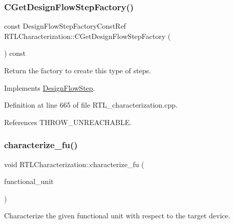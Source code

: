 \subsubsection{\texorpdfstring{C\+Get\+Design\+Flow\+Step\+Factory()}{CGetDesignFlowStepFactory()}}
{\footnotesize\ttfamily const Design\+Flow\+Step\+Factory\+Const\+Ref R\+T\+L\+Characterization\+::\+C\+Get\+Design\+Flow\+Step\+Factory (\begin{DoxyParamCaption}{ }\end{DoxyParamCaption}) const\hspace{0.3cm}{\ttfamily [virtual]}}



Return the factory to create this type of steps. 



Implements \hyperlink{classDesignFlowStep_a5510a8d296670a07f6b53312c448994c}{Design\+Flow\+Step}.



Definition at line 665 of file R\+T\+L\+\_\+characterization.\+cpp.



References T\+H\+R\+O\+W\+\_\+\+U\+N\+R\+E\+A\+C\+H\+A\+B\+LE.

\mbox{\label{classRTLCharacterization_a2c6d6535a7801fbb3d01b3cbace87874}} 
\subsubsection{\texorpdfstring{characterize\+\_\+fu()}{characterize\_fu()}}
{\footnotesize\ttfamily void R\+T\+L\+Characterization\+::characterize\+\_\+fu (\begin{DoxyParamCaption}\item[{const \hyperlink{technology__node_8hpp_a33dd193b7bd6b987bf0d8a770a819fa7}{technology\+\_\+node\+Ref}}]{functional\+\_\+unit }\end{DoxyParamCaption})\hspace{0.3cm}{\ttfamily [private]}}



Characterize the given functional unit with respect to the target device. 

\mbox{\label{classRTLCharacterization_a9f3427f34b9800e5bd6e3fa7a121908a}} 
